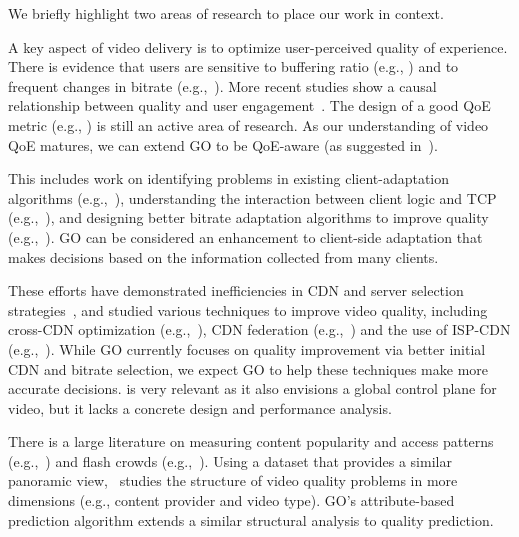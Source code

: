 We briefly highlight two areas of research to place our work in context.

A key aspect of video delivery is to optimize user-perceived  quality of experience.  There is evidence that
users are sensitive to buffering ratio (e.g., \cite{sigcomm11}) and to frequent changes in bitrate (e.g.,~\cite{user-adaptive,videoqoe}). More recent studies show a causal relationship between quality and user engagement~\cite{akamai-imc12}. The design of a good QoE metric (e.g., \cite{qscore}) is still an active area of research. As our understanding of video QoE matures, we can extend GO to be QoE-aware (as suggested in~\cite{sekar2012quest}).

 This includes work on identifying problems in existing client-adaptation algorithms (e.g.,~\cite{mmsys2011cisco}), understanding the interaction between client logic and TCP (e.g.,~\cite{usenix12_ghobadi,nossdav12_esteban}), and designing better bitrate adaptation algorithms to improve quality (e.g.,~\cite{nossdav12_akhshabi,festive}). GO can be considered an enhancement to client-side adaptation that makes decisions based on the information collected from many clients.

 These efforts have demonstrated inefficiencies in CDN and server selection strategies~\cite{youtubecdn,youtube-infra}, and studied various techniques to improve video quality, including cross-CDN optimization (e.g.,~\cite{sigcomm12cdnmulti}), CDN federation (e.g.,~\cite{peterson2013framework}) and the use of ISP-CDN (e.g.,~\cite{yu2012tradeoffs,frank2013pushing}).  While GO currently focuses on quality improvement via better initial CDN and bitrate selection, we expect GO to help these techniques make more accurate decisions. \cite{sigcomm12} is very relevant as it also envisions a global control plane for video, but it lacks a concrete design and performance analysis. 

  There is a large literature on measuring content popularity and access patterns (e.g.,~\cite{youtube-imc07,plissonneau2012longitudinal}) and flash crowds (e.g.,~\cite{beijing-imc09}). Using a dataset that provides a similar panoramic view,~\cite{jiang2013shedding} studies the structure of video quality problems in more dimensions (e.g., content provider and video type). GO's attribute-based prediction algorithm extends a similar structural analysis to quality prediction.

